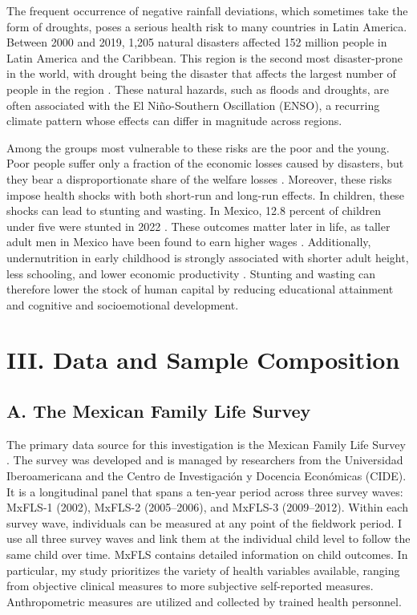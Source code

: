 \documentclass[12pt]{article}
\begin{document}
The frequent occurrence of negative rainfall deviations, which sometimes take the form of droughts, poses a serious health risk to many countries in Latin America. Between 2000 and 2019, 1,205 natural disasters affected 152 million people in Latin America and the Caribbean. This region is the second most disaster-prone in the world, with drought being the disaster that affects the largest number of people in the region \parencite{ochaNaturalDisastersLatin2020}. These natural hazards, such as floods and droughts, are often associated with the El Ni\~no-Southern Oscillation (ENSO), a recurring climate pattern whose effects can differ in magnitude across regions.

Among the groups most vulnerable to these risks are the poor and the young. Poor people suffer only a fraction of the economic losses caused by disasters, but they bear a disproportionate share of the welfare losses \parencite{hallegatteUnbreakableBuildingResilience2017}. Moreover, these risks impose health shocks with both short-run and long-run effects. In children, these shocks can lead to stunting and wasting. In Mexico, 12.8 percent of children under five were stunted in 2022 \parencite{cuevas-nasuEstadoNutricionNinas2023}. These outcomes matter later in life, as taller adult men in Mexico have been found to earn higher wages \parencite{voglHeightSkillsLabor2014}. Additionally, undernutrition in early childhood is strongly associated with shorter adult height, less schooling, and lower economic productivity \parencite{victoraMaternalChildUndernutrition2008}. Stunting and wasting can therefore lower the stock of human capital by reducing educational attainment and cognitive and socioemotional development.

\section*{III. Data and Sample Composition}\label{sec:III}

\subsection*{A. The Mexican Family Life Survey}

The primary data source for this investigation is the Mexican Family Life Survey \parencite[MxFLS;][]{rubalcavaUsersGuideMexican2006,rubalcavaUsersGuideMexican2013}. The survey was developed and is managed by researchers from the Universidad Iberoamericana and the Centro de Investigaci\'on y Docencia Econ\'omicas (CIDE). It is a longitudinal panel that spans a ten-year period across three survey waves: MxFLS-1 (2002), MxFLS-2 (2005--2006), and MxFLS-3 (2009--2012). Within each survey wave, individuals can be measured at any point of the fieldwork period. I use all three survey waves and link them at the individual child level to follow the same child over time. MxFLS contains detailed information on child outcomes. In particular, my study prioritizes the variety of health variables available, ranging from objective clinical measures to more subjective self-reported measures. Anthropometric measures are utilized and collected by trained health personnel.
\end{document}
